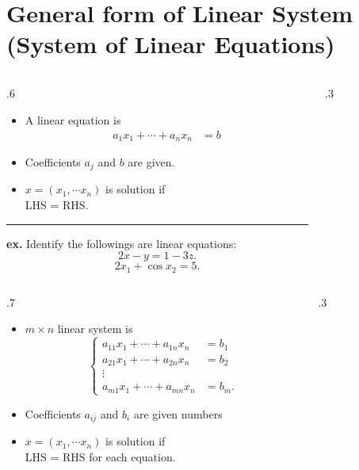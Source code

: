 \documentclass{beamer}
\theoremstyle{definition}
\theoremstyle{theorem}
\begin{document}
\section{General form of Linear System (System of Linear Equations)}
\begin{frame}
\begin{columns}
\begin{column}
 {.6\textwidth}
 \begin{itemize}
 \item A linear equation is
\begin{equation*}
 \label{eq:02}
\begin{array}
 {ll}
 a_{1} x_{1} + \cdots + a_{n} x_{n} &= b
\end{array}
\end{equation*}
\item Coefficients $a_{j}$ and $b$ are given.
\item $x = (x_{1}, \cdots x_{n})$ is solution if \\LHS = RHS.
\end{itemize}
\hrule
\vspace{.2in}
{\tiny
{\bf ex.} Identify the followings are linear equations:
$$2x - y = 1-3z.$$
$$ 2 x_{1} + \cos x_{2} = 5.$$
}
\end{column}
\begin{column}
 {.3\textwidth}
\end{column}
\end{columns}
\end{frame}



\begin{frame}
\begin{columns}
\begin{column}
 {.7\textwidth}
 \begin{itemize}
 \item $m\times n$ linear system is 
\begin{equation*}
 \label{eq:02}
\left\{
\begin{array}
 {ll}
 a_{11} x_{1} + \cdots + a_{1n} x_{n} &= b_{1} \\
 a_{21} x_{1} + \cdots + a_{2n} x_{n} &= b_{2} \\
 \vdots \\
 a_{m1} x_{1} + \cdots + a_{mn} x_{n} &= b_{m}.
\end{array}
\right.
\end{equation*}
\item Coefficients $a_{ij}$ and $b_{i}$ are given numbers
\item $x = (x_{1}, \cdots x_{n})$ is solution if \\
LHS = RHS for each equation.
\end{itemize}

\end{column}
\begin{column}
 {.3\textwidth}
\end{column}
\end{columns}

 
\end{frame}
\end{document}
